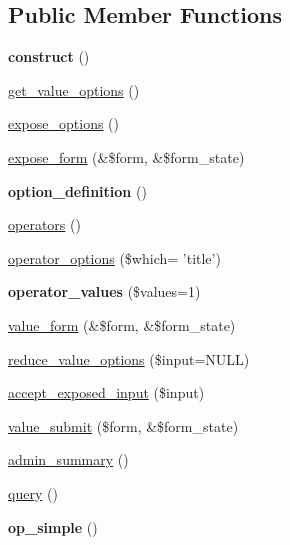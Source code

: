 \subsection*{Public Member Functions}
\begin{DoxyCompactItemize}
\item 
\hypertarget{classviews__handler__filter__in__operator_a1ec0f531f2c590ef15468ae06c5d0284}{
{\bfseries construct} ()}
\label{classviews__handler__filter__in__operator_a1ec0f531f2c590ef15468ae06c5d0284}

\item 
\hyperlink{classviews__handler__filter__in__operator_aa5b5df6d90f4359ed28c0c446bdc81a6}{get\_\-value\_\-options} ()
\item 
\hyperlink{classviews__handler__filter__in__operator_a0ed328117721ce41a3744f0339c16527}{expose\_\-options} ()
\item 
\hyperlink{classviews__handler__filter__in__operator_a23bfbd98ea5838480365b21e952bf9f4}{expose\_\-form} (\&\$form, \&\$form\_\-state)
\item 
\hypertarget{classviews__handler__filter__in__operator_a76892fbc2f6206e88d83925e187c4ab7}{
{\bfseries option\_\-definition} ()}
\label{classviews__handler__filter__in__operator_a76892fbc2f6206e88d83925e187c4ab7}

\item 
\hyperlink{classviews__handler__filter__in__operator_ae22d2c1d388a5b1457960c492ffc1fe1}{operators} ()
\item 
\hyperlink{classviews__handler__filter__in__operator_a5b972dd25d26a7010ae9f63cbc926577}{operator\_\-options} (\$which= 'title')
\item 
\hypertarget{classviews__handler__filter__in__operator_a90255b49970c7d1a5e77932d8982edfd}{
{\bfseries operator\_\-values} (\$values=1)}
\label{classviews__handler__filter__in__operator_a90255b49970c7d1a5e77932d8982edfd}

\item 
\hyperlink{classviews__handler__filter__in__operator_a6736083657cad0f8c7299b000f2b8e60}{value\_\-form} (\&\$form, \&\$form\_\-state)
\item 
\hyperlink{classviews__handler__filter__in__operator_a852f413796906e05a5dca6e839e8e470}{reduce\_\-value\_\-options} (\$input=NULL)
\item 
\hyperlink{classviews__handler__filter__in__operator_aff2b25941729b9ca81e1e53bb8e95a96}{accept\_\-exposed\_\-input} (\$input)
\item 
\hyperlink{classviews__handler__filter__in__operator_af7b01b1f4e53aec7f4b1065606819624}{value\_\-submit} (\$form, \&\$form\_\-state)
\item 
\hyperlink{classviews__handler__filter__in__operator_a2c17bde9b5cb3498d31786ba888d545c}{admin\_\-summary} ()
\item 
\hyperlink{classviews__handler__filter__in__operator_af4b9a596ad1e6fbee116977ca0a7d8a9}{query} ()
\item 
\hypertarget{classviews__handler__filter__in__operator_abf6b2578642bcd288425ff9754fec3eb}{
{\bfseries op\_\-simple} ()}
\label{classviews__handler__filter__in__operator_abf6b2578642bcd288425ff9754fec3eb}


\end{DoxyCompactItemize}
